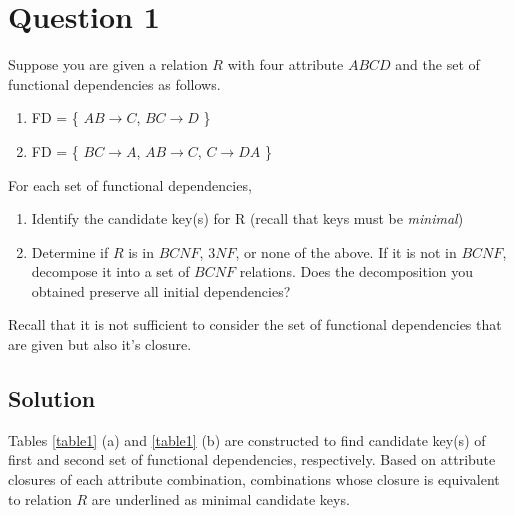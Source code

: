 
\section*{Question 1}

Suppose you are given a relation $R$ with four attribute $ABCD$ and the set of functional dependencies as follows.

\begin{enumerate}
\item FD = \{ $AB\rightarrow C$, $BC\rightarrow D$ \}
\item FD = \{ $BC\rightarrow A$, $AB\rightarrow C$, $C\rightarrow DA$ \}
\end{enumerate}

For each set of functional dependencies,

\begin{enumerate}[label=(\alph*)]
\item Identify the candidate key(s) for R (recall that keys must be \textit{minimal})
\item Determine if $R$ is in $BCNF$, $3NF$, or none of the above. If it is not in $BCNF$, decompose it into a set of $BCNF$ relations. Does the decomposition you obtained preserve all initial dependencies?
\end{enumerate}

Recall that it is not sufficient to consider the set of functional dependencies that are given but also it's closure.

\subsection*{Solution}

Tables \ref{table1} (a) and \ref{table1} (b) are constructed to find candidate key(s) of first and second set of functional dependencies, respectively.
Based on attribute closures of each attribute combination, combinations whose closure is equivalent to relation $R$ are underlined as minimal candidate keys.

